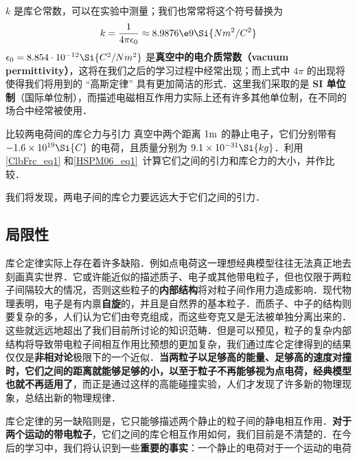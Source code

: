$k$ 是库仑常数，可以在实验中测量；我们也常常将这个符号替换为
\begin{equation}
k = \frac{1}{4\pi\epsilon_0} \approx 8.9876\e9 \Si{N m^2/C^2}
\end{equation}
$\epsilon_0=8.854\cdot 10^{-12} \Si{C^2/Nm^2}$ 是\textbf{真空中的电介质常数（vacuum permittivity）}，这将在我们之后的学习过程中经常出现；而上式中 $4\pi$ 的出现将使得我们将用到的 “高斯定律” 具有更加简洁的形式．这里我们采取的是\textbf{ SI 单位制}（国际单位制），而描述电磁相互作用力实际上还有许多其他单位制，在不同的场合中经常被使用．

\begin{exercise}{比较两电荷间的库仑力与引力}
真空中两个距离 $1 \rm m$ 的静止电子，它们分别带有 $-1.6\times 10^{19} \Si{C}$ 的电荷，且质量分别为 $9.1\times 10^{-31} \Si{kg}$．利用\autoref{ClbFrc_eq1} 和\autoref{HSPM06_eq1}~计算它们之间的引力和库仑力的大小，并作比较．
\end{exercise}
我们将发现，两电子间的库仑力要远远大于它们之间的引力．
\subsection{局限性}
库仑定律实际上存在着许多缺陷．例如点电荷这一理想经典模型往往无法真正地去刻画真实世界．它或许能近似的描述质子、电子或其他带电粒子，但也仅限于两粒子间隔较大的情况，否则这些粒子的\textbf{内部结构}将对粒子间作用力造成影响．现代物理表明，电子是有内禀\textbf{自旋}的，并且是自然界的基本粒子．而质子、中子的结构则要复杂的多，人们认为它们由夸克组成，而这些夸克又是无法被单独分离出来的．这些就远远地超出了我们目前所讨论的知识范畴．但是可以预见，粒子的复杂内部结构将导致带电粒子间相互作用比预想的更加复杂，我们通过库仑定律得到的结果仅仅是\textbf{非相对论}极限下的一个近似．\textbf{当两粒子以足够高的能量、足够高的速度对撞时，它们之间的距离就能够足够的小，以至于粒子不再能够视为点电荷，经典模型也就不再适用了}，而正是通过这样的高能碰撞实验，人们才发现了许多新的物理现象，总结出新的物理规律．

库仑定律的另一缺陷则是，它只能够描述两个静止的粒子间的静电相互作用．\textbf{对于两个运动的带电粒子}，它们之间的库仑相互作用如何，我们目前是不清楚的．在今后的学习中，我们将认识到一些\textbf{重要的事实}：一个静止的电荷对于一个运动的电荷